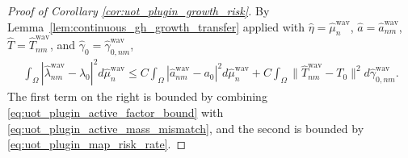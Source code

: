 \documentclass[11pt,reqno]{amsart}
\theoremstyle{definition}
\renewcommand{\hat}{\widehat}
\begin{document}
\begin{proof}[Proof of Corollary \ref{cor:uot_plugin_growth_risk}]
By Lemma~\ref{lem:continuous_gh_growth_transfer} applied with $\hat\eta=\hat\mu_n^{\mathrm{wav}}$, $\hat a=\hat a_{nm}^{\mathrm{wav}}$, $\hat T=\hat T_{nm}^{\mathrm{wav}}$, and $\hat\gamma_0=\hat\gamma_{0,nm}^{\mathrm{wav}}$,
\begin{align*}
    \int_{\Omega}|\hat\lambda_{nm}^{\mathrm{wav}}-\lambda_0|^2 d\hat\mu_n^{\mathrm{wav}}
    \le
    C\int_{\Omega}|\hat a_{nm}^{\mathrm{wav}}-a_0|^2 d\hat\mu_n^{\mathrm{wav}}
    +C\int_{\Omega}\|\hat T_{nm}^{\mathrm{wav}}-T_0\|^2 d\hat\gamma_{0,nm}^{\mathrm{wav}}.
\end{align*}
The first term on the right is bounded by combining \eqref{eq:uot_plugin_active_factor_bound} with \eqref{eq:uot_plugin_active_mass_mismatch}, and the second is bounded by \eqref{eq:uot_plugin_map_risk_rate}.
\end{proof}
\end{document}
